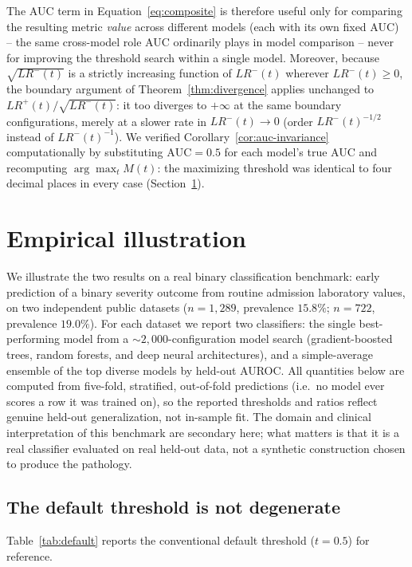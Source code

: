 \documentclass[11pt]{article}
\begin{document}
The AUC term in Equation~\ref{eq:composite} is therefore useful only for
comparing the resulting metric \emph{value} across different models (each
with its own fixed AUC) -- the same cross-model role AUC ordinarily plays
in model comparison \citep{delong1988,zou2007} -- never for improving the
threshold search within a single model. Moreover, because $\sqrt{LR^-(t)}$
is a strictly increasing function of $LR^-(t)$ wherever $LR^-(t) \geq 0$,
the boundary argument of Theorem~\ref{thm:divergence} applies unchanged to
$LR^+(t)/\sqrt{LR^-(t)}$: it too diverges to $+\infty$ at the same boundary
configurations, merely at a slower rate in $LR^-(t) \to 0$ (order
$LR^-(t)^{-1/2}$ instead of $LR^-(t)^{-1}$). We verified
Corollary~\ref{cor:auc-invariance} computationally by substituting
$\mathrm{AUC}=0.5$ for each model's true AUC and recomputing
$\arg\max_t M(t)$: the maximizing threshold was identical to four decimal
places in every case (Section~\ref{sec:empirical}).

\section{Empirical illustration}
\label{sec:empirical}

We illustrate the two results on a real binary classification benchmark:
early prediction of a binary severity outcome from routine admission
laboratory values, on two independent public datasets ($n=1{,}289$,
prevalence $15.8\%$; $n=722$, prevalence $19.0\%$). For each dataset we
report two classifiers: the single best-performing model from a
$\sim\!2{,}000$-configuration model search (gradient-boosted trees,
random forests, and deep neural architectures), and a simple-average
ensemble \citep{dietterich2000,breiman1996} of the top diverse models by
held-out AUROC. All quantities below are computed from five-fold,
stratified, out-of-fold predictions (i.e.\ no model ever scores a row it was
trained on), so the reported thresholds and ratios reflect genuine held-out
generalization, not in-sample fit. The domain and clinical interpretation of
this benchmark are secondary here; what matters is that it is a real
classifier evaluated on real held-out data, not a synthetic construction
chosen to produce the pathology.

\subsection{The default threshold is not degenerate}

Table~\ref{tab:default} reports the conventional default threshold
($t=0.5$) for reference.
\end{document}
